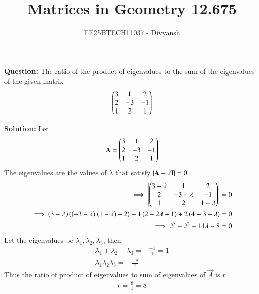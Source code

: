 \documentclass[journal,12pt,onecolumn]{IEEEtran}
\title{Matrices in Geometry 12.675}
\author{EE25BTECH11037 - Divyansh}
\theoremstyle{remark}
\begin{document}
\vspace{3cm}
\maketitle
{\let\newpage\relax\maketitle}
\textbf{Question: }
The ratio of the product of eigenvalues to the sum of the eigenvalues of the given matrix 
\begin{align*}
    \begin{pmatrix}3&1&2\\2&-3&-1\\1&2&1\end{pmatrix}
\end{align*}
\vspace{2mm}


\textbf{Solution:}
Let 
\begin{align}
    \mathbf{A}=\begin{pmatrix}3&1&2\\2&-3&-1\\1&2&1\end{pmatrix}
\end{align}
The eigenvalues are the values of $\lambda$ that satisfy $\left\vert \mathbf{A} - \lambda\mathbf{I}\right\vert = 0$
\begin{align}
    \implies \left\vert\begin{pmatrix}3-\lambda&1&2\\2&-3-\lambda&-1\\1&2&1-\lambda\end{pmatrix}\right\vert=0\\
    \implies \left(3-\lambda\right)\left( \left(-3-\lambda\right)\left(1-\lambda\right) +2\right) - 1\left(2-2\lambda + 1\right) + 2\left(4 + 3 + \lambda\right)=0\\
    \implies \lambda^3 - \lambda^2 - 11\lambda - 8 = 0
\end{align}
Let the eigenvalues be $\lambda_1, \lambda_2  , \lambda_3$, then
\begin{align}
    \lambda_1+ \lambda_2  + \lambda_3 = -\frac{-1}{1} =1\\
    \lambda_1 \lambda_2   \lambda_3 = -\frac{-8}{1}
\end{align}
Thus the ratio of product of eigenvalues to sum of eigenvalues of $\vec{A}$ is $r$
\begin{align}
    r=\frac{8}{1} = 8
\end{align}
\end{document}
